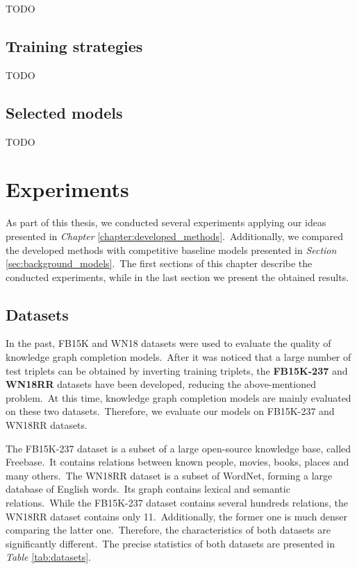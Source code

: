 \documentclass[longabstract, english, mgr]{iithesis}
\newcommand\numberedchapter[1]{\setlength\topskip{3cm}\chapter{#1}\setlength\topskip{0cm}}
\theoremstyle{default_theorem_style}\newtheorem{theorem}{Theorem}
\theoremstyle{default_theorem_style}\newtheorem{definition}{Definition}
\begin{document}
TODO

\section{Training strategies}

TODO

\section{Selected models}

TODO

\numberedchapter{Experiments}\label{chapter:experiments}

As part of this thesis, we conducted several experiments applying our ideas presented in
\textit{Chapter} \ref{chapter:developed_methods}.\ Additionally, we compared the developed methods with competitive
baseline models presented in \textit{Section} \ref{sec:background_models}.\ The first sections of this chapter describe
the conducted experiments, while in the last section we present the obtained results.

\section{Datasets}

In the past, FB15K and WN18 datasets were used to evaluate the quality of knowledge graph completion models.\ After
it was noticed that a large number of test triplets can be obtained by inverting training triplets, the
\textbf{FB15K-237} and \textbf{WN18RR} datasets have been developed, reducing the above-mentioned problem.\ At this
time, knowledge graph completion models are mainly evaluated on these two datasets.\ Therefore, we evaluate our models
on FB15K-237 and WN18RR datasets.\newline

\noindent The FB15K-237 dataset is a subset of a large open-source knowledge base, called Freebase.\ It contains
relations between known people, movies, books, places and many others.\ The WN18RR dataset is a subset of WordNet,
forming a large database of English words.\ Its graph contains lexical and semantic relations.\ While the FB15K-237
dataset contains several hundreds relations, the WN18RR dataset contains only 11.\ Additionally, the former
one is much denser comparing the latter one.\ Therefore, the characteristics of both datasets are significantly
different.\ The precise statistics of both datasets are presented in \textit{Table} \ref{tab:datasets}.
\end{document}

